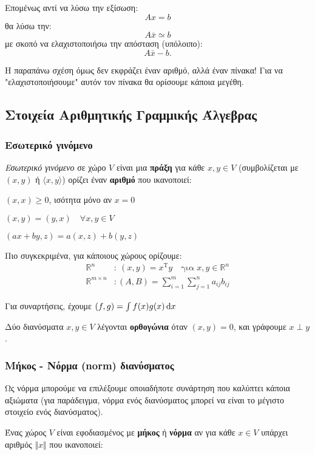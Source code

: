 \documentclass[11pt,a4paper,notitlepage,fleqn]{article}
\begin{document}
	Επομένως αντί να λύσω την εξίσωση:
	\[
	Ax = b
	\]
	θα λύσω την:
	\[
	A\bar x \simeq b
	\]
	με σκοπό να ελαχιστοποιήσω την απόσταση (υπόλοιπο):
	\[
	A\bar x -b.
	\]
	
	Η παραπάνω σχέση όμως δεν εκφράζει έναν αριθμό, αλλά έναν πίνακα!
	Για να "ελαχιστοποιήσουμε" αυτόν τον πίνακα θα ορίσουμε κάποια
	μεγέθη.
	
	\subsection{Στοιχεία Αριθμητικής Γραμμικής Άλγεβρας}
	\subsubsection{Εσωτερικό γινόμενο}
	\textit{Εσωτερικό γινόμενο} σε χώρο \( V \) είναι μια \textbf{πράξη}
	για κάθε \( x,y \in V \) 
	(συμβολίζεται με \( (x,y) \) ή \( \langle x,y \rangle \))
	ορίζει έναν \textbf{αριθμό} που ικανοποιεί:
	\begin{enumroman}
		\item \( (x,x) \geq 0 \), ισότητα μόνο αν \( x=0 \)
		\item \( (x,y) = (y,x) \quad \forall x,y\in V \)
		\item \( (ax+by,z) = a(x,z)+b(y,z) \)
	\end{enumroman}
	
	Πιο συγκεκριμένα, για κάποιους χώρους ορίζουμε:
	\begin{align*}
	\mathbb R^n &: \ (x,y) = x^{\mathrm T}y \quad
	\text{για } x,y \in \mathbb R^n
	\\
	\mathbb R^{m\times n} &: (A,B) =
	\sum_{i=1}^{m}\sum_{j=1}^{n} a_{ij}b_{ij}
	\end{align*}
	
	Για συναρτήσεις, έχουμε \( (f,g) = \int f(x)g(x)\mathop{}\!\mathrm{d} x \)
	
	Δύο διανύσματα \( x,y \in V \) λέγονται \textbf{ορθογώνια} όταν
	\( (x,y) = 0\), και γράφουμε \( x \perp y \).
	
	\subsubsection{Μήκος - Νόρμα (norm) διανύσματος}
	Ως νόρμα μπορούμε να επιλέξουμε οποιαδήποτε συνάρτηση που καλύπτει
	κάποια αξιώματα (για παράδειγμα, νόρμα ενός διανύσματος μπορεί να
	είναι το μέγιστο στοιχείο ενός διανύσματος).
	
	Ένας χώρος \( V \) είναι εφοδιασμένος με \textbf{μήκος} ή
	\textbf{νόρμα} αν για κάθε \( x \in V \) υπάρχει αριθμός
	\( \Vert x\Vert \) που ικανοποιεί:
	
\end{document}
